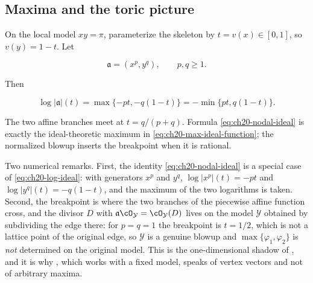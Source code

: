\subsection{Maxima and the toric picture}
\label{sec:ch20-ex-max-toric}

\begin{example}
\label{ex:ch20-nodal-max}
On the local model $xy=\pi$, parameterize the skeleton by
$t=v(x)\in[0,1]$, so $v(y)=1-t$.  Let

\[
              \mathfrak a=(x^p,y^q),\qquad p,q\geq1.
\]

Then

\begin{equation}
\label{eq:ch20-nodal-ideal}
 \log|\mathfrak a|(t)
   =\max\{-pt,-q(1-t)\}
   =-\min\{pt,q(1-t)\}.
\end{equation}

The two affine branches meet at $t=q/(p+q)$.  Formula
\eqref{eq:ch20-nodal-ideal} is exactly the ideal-theoretic maximum in
\eqref{eq:ch20-max-ideal-function}; the normalized blowup inserts the
breakpoint when it is rational.

Two numerical remarks.  First, the identity
\eqref{eq:ch20-nodal-ideal} is a special case of
\eqref{eq:ch20-log-ideal}: with generators $x^p$ and $y^q$,
$\log|x^p|(t)=-pt$ and $\log|y^q|(t)=-q(1-t)$, and the maximum of the
two logarithms is taken.  Second, the breakpoint is where the two branches
of the piecewise affine function cross, and the divisor $D$ with
$\mathfrak a\cO_{\mathcal Y}=\cO_{\mathcal Y}(D)$ lives on the model
$\mathcal Y$ obtained by subdividing the edge there: for
$p=q=1$ the breakpoint is $t=1/2$, which is not a lattice point of the
original edge, so $\mathcal Y$ is a genuine blowup and
$\max\{\varphi_1,\varphi_2\}$ is \emph{not} determined on the original
model.  This is the one-dimensional shadow of
, and it is why
, which works with a fixed model, speaks of
vertex vectors and not of arbitrary maxima.
\end{example}


